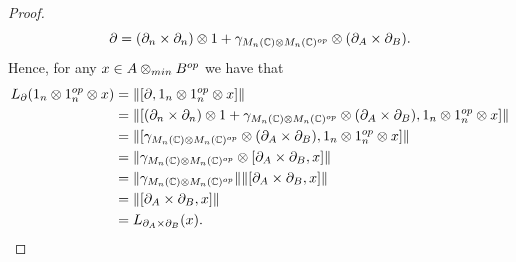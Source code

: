 \documentclass[10pt,a4paper]{amsart}
\newcommand{\bbC}{\mathbb{C}}
\begin{document}
\begin{proof}
    \begin{equation*}
        \partial
        = (\partial_n \times \partial_n) \otimes 1
        + \gamma_{M_n(\bbC) \otimes M_n(\bbC)^{\rm op}} \otimes (\partial_A \times \partial_B).
    \end{equation*}
    Hence, for any $x \in A \otimes_{\rm min} B^{\rm op}$ we have that
    \begin{align*}
        L_\partial(1_n \otimes 1_n^{\rm op} \otimes x)
        & = \|[\partial, 1_n \otimes 1_n^{\rm op} \otimes x]\| \\
        & = \|[(\partial_n \times \partial_n) \otimes 1 + \gamma_{M_n(\bbC) \otimes M_n(\bbC)^{\rm op}} \otimes (\partial_A \times \partial_B), 1_n \otimes 1_n^{\rm op} \otimes x]\| \\
        & = \|[\gamma_{M_n(\bbC) \otimes M_n(\bbC)^{\rm op}} \otimes (\partial_A \times \partial_B), 1_n \otimes 1_n^{\rm op} \otimes x]\| \\
        & = \|\gamma_{M_n(\bbC) \otimes M_n(\bbC)^{\rm op}} \otimes [\partial_A \times \partial_B, x]\| \\
        & = \|\gamma_{M_n(\bbC) \otimes M_n(\bbC)^{\rm op}}\| \|[\partial_A \times \partial_B, x]\| \\
        & = \| [\partial_A \times \partial_B, x]\| \\
        & = L_{\partial_A \times \partial_B}(x). \qedhere
    \end{align*}
\end{proof}
\end{document}
